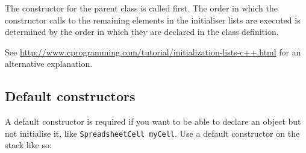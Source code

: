 \documentclass[a4paper,12pt]{article}
\begin{document}
The constructor for the parent class is called first. The order in which the constructor calls to the remaining elements in the initialiser lists are executed is determined by the order in which they are declared in the class definition.


See {\footnotesize\url{http://www.cprogramming.com/tutorial/initialization-lists-c++.html}} for an alternative explanation.

\subsection{Default constructors}
A default constructor is required if you want to be able to declare an object but not initialise it, like \lstinline|SpreadsheetCell myCell|. Use a default constructor on the stack like so:
\end{document}
